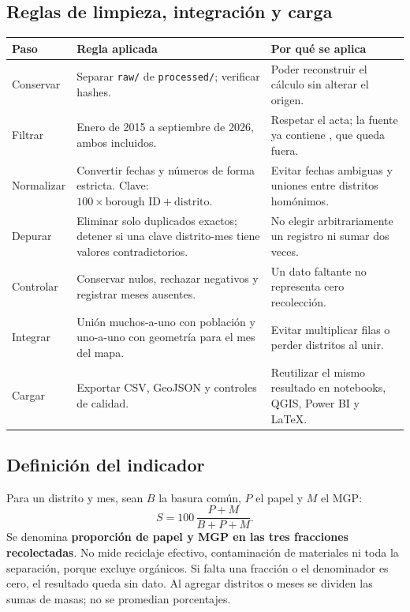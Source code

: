 \documentclass[10pt,a4paper]{article}
\newcommand{\archivo}[1]{\nolinkurl{#1}}
\begin{document}
\newpage
\subsection{Reglas de limpieza, integración y carga}
\begin{center}\small
\begin{tabularx}{\linewidth}{@{}p{2.7cm}YY@{}}
\toprule
\textbf{Paso} & \textbf{Regla aplicada} & \textbf{Por qué se aplica} \\\midrule
Conservar & Separar \archivo{raw/} de \archivo{processed/}; verificar hashes. & Poder reconstruir el cálculo sin alterar el origen. \\
Filtrar & Enero de 2015 a septiembre de 2026, ambos incluidos. & Respetar el acta; la fuente ya contiene \FinFuente{}, que queda fuera. \\
Normalizar & Convertir fechas y números de forma estricta. Clave: $100\times\text{borough ID}+\text{distrito}$. & Evitar fechas ambiguas y uniones entre distritos homónimos. \\
Depurar & Eliminar solo duplicados exactos; detener si una clave distrito-mes tiene valores contradictorios. & No elegir arbitrariamente un registro ni sumar dos veces. \\
Controlar & Conservar nulos, rechazar negativos y registrar meses ausentes. & Un dato faltante no representa cero recolección. \\
Integrar & Unión muchos-a-uno con población y uno-a-uno con geometría para el mes del mapa. & Evitar multiplicar filas o perder distritos al unir. \\
Cargar & Exportar CSV, GeoJSON y controles de calidad. & Reutilizar el mismo resultado en notebooks, QGIS, Power BI y LaTeX. \\
\bottomrule
\end{tabularx}\end{center}

\subsection{Definición del indicador}
Para un distrito y mes, sean $B$ la basura común, $P$ el papel y $M$ el MGP:
\[
S=100\,\frac{P+M}{B+P+M}.
\]
Se denomina \textbf{proporción de papel y MGP en las tres fracciones recolectadas}. No mide reciclaje efectivo, contaminación de materiales ni toda la separación, porque excluye orgánicos. Si falta una fracción o el denominador es cero, el resultado queda sin dato. Al agregar distritos o meses se dividen las sumas de masas; no se promedian porcentajes.
\end{document}
